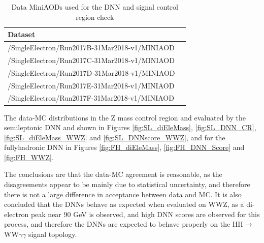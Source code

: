 \begin{table}[!h]
    \centering
        \begin{tabular}{lc}
            \hline
            Dataset \\
            \hline
            /SingleElectron/Run2017B-31Mar2018-v1/MINIAOD \\
            /SingleElectron/Run2017C-31Mar2018-v1/MINIAOD \\
            /SingleElectron/Run2017D-31Mar2018-v1/MINIAOD \\
            /SingleElectron/Run2017E-31Mar2018-v1/MINIAOD \\
            /SingleElectron/Run2017F-31Mar2018-v1/MINIAOD \\ \hline 
        \end{tabular}
    \caption{
        Data MiniAODs used for the DNN and signal control region check
    }
    \label{tab:CR_samples}
\end{table}

\newpage 

The data-MC distributions in the Z mass control region and evaluated by the semileptonic DNN and shown in Figures \ref{fig:SL_diEleMass}, \ref{fig:SL_DNN_CR}, \ref{fig:SL_diEleMass_WWZ} and \ref{fig:SL_DNNscore_WWZ}, and for the fullyhadronic DNN in Figures \ref{fig:FH_diEleMass}, \ref{fig:FH_DNN_Score} and \ref{fig:FH_WWZ}.

The conclusions are that the data-MC agreement is 
reasonable, as the disagreements appear to be mainly due to statistical uncertainty, and therefore there is not a large difference in acceptance between data and MC. It is also concluded that the DNNs behave as expected when evaluated on WWZ, as a di-electron peak near 90 GeV is observed, and high DNN scores are observed for this process, and therefore the DNNs are expected to behave 
properly on the HH$\rightarrow$WW$\gamma\gamma$ signal topology. 


